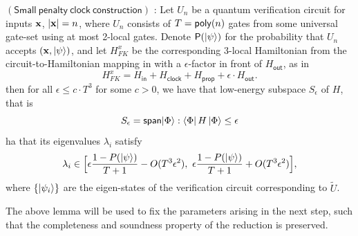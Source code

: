 \documentclass[11pt]{article}
\begin{document}
\begin{lemma}\label{lemma:DFG22}
    $(\mathsf{Small\ penalty\ clock\ construction})$ \cite{deshpande2022importance}: Let $U_n$ be a quantum verification circuit for inputs $\mathbf{x}$, $|\mathbf{x}|=n$, where $U_n$ consists of $T=\mathsf{poly}(n)$ gates from some universal gate-set using at most 2-local gates. Denote $\mathsf{P(\ket{\psi})}$ for the probability that $U_n$ accepts $\mathsf{(\mathbf{x},\ket{\psi})}$, and let $H_{FK}^x$ be the corresponding 3-local Hamiltonian from the circuit-to-Hamiltonian mapping in \cite{kempe2004complexity} with a $\epsilon$-factor in front of $H_{\mathsf{out}}$, as in
    \begin{equation}\label{eqn:eps-GLG22}
        H^{x}_{FK} =H_{\mathsf{in}} + H_{\mathsf{clock}} + H_{\mathsf{prop}} + \epsilon \cdot H_{\mathsf{out}}.
    \end{equation}
    then for all $\epsilon \leq c \cdot T^3$ for some $c>0$, we have that low-energy subspace $S_\epsilon$ of $H$, that is
    \begin{equation}
        S_\epsilon = \mathsf{span}{\ket{\Phi}:\bra{\Phi}H\ket{\Phi}\leq \epsilon}
    \end{equation}
    ha that its eigenvalues $\lambda_i$ satisfy 
    \begin{equation}\label{eqn:lambda-limits-glg22}
        \lambda_i \in \Big[ \epsilon\frac{1-P(\si)}{T+1}-O(T^3\epsilon^2),\ \epsilon\frac{1-P(\si)}{T+1} + O(T^3\epsilon^2) \Big],
    \end{equation}
    where $\{\ket{\psi_i}\}$ are the eigen-states of the verification circuit corresponding to $\tilde{U}$.
\end{lemma}
The above lemma will be used to fix the parameters arising in the next step, such that the completeness and soundness property of the reduction is preserved.\newline
\end{document}

